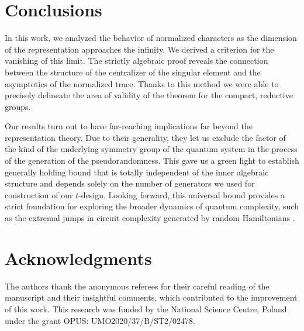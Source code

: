 \documentclass[11pt, a4paper]{article}
\theoremstyle{definition}
\theoremstyle{remark}
\begin{document}
\section{Conclusions}
\label{sec:conclusion}

In this work, we analyzed the behavior of normalized characters as the dimension of the representation approaches the infinity. We derived a criterion for the vanishing of this limit. The strictly algebraic proof reveals the connection between the structure of the centralizer of the singular element and the asymptotics of the normalized trace. Thanks to this method we were able to precisely delineate  the area of validity of the theorem for the compact, reductive groups.


Our results turn out to have far-reaching implications far beyond the representation theory. Due to their generality, they let us exclude the factor of the kind of the underlying symmetry group of the quantum system in the process of the generation of the pseudorandomness. This gave us a green light to establish generally holding bound that is totally independent of the inner algebraic structure and depends solely on the number of generators we used for construction of our $t$-design. Looking forward, this universal bound provides a strict foundation for exploring the broader dynamics of quantum complexity, such as the extremal jumps in circuit complexity generated by random Hamiltonians \cite{Kotowski2025}.



\section*{Acknowledgments}
The authors thank the anonymous referees for their careful reading of the manuscript and their insightful comments, which contributed to the improvement of this work. This research was funded by the National Science Centre, Poland under the grant OPUS: UMO2020/37/B/ST2/02478.



\end{document}
